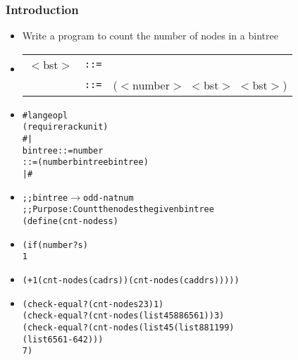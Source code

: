 \documentclass{beamer}
\newcommand{\arrow}{\(\rightarrow\)}
\newcommand{\elist}{\texttt{\textquotesingle{()}}}
\newcommand{\is}{\texttt{::=}}
\begin{document}
\begin{frame}[fragile]
\frametitle{Introduction}
\begin{scriptsize}
\begin{itemize}
\item<1-> Write a program to count the number of nodes in a bintree

\item<2->
\begin{tabular}{lll}
    $<$bst$>$ & \is{} & \elist{} \\
     & \is{} & ($<$number$>$ $<$bst$>$ $<$bst$>$) \\
\end{tabular}

\item<3->
\begin{alltt}
#lang eopl
(require rackunit)
#|
bintree \is{} number
        \is{} (number bintree bintree)
|#
\end{alltt}

\item<4->
\begin{alltt}
;; bintree \arrow{} odd-natnum
;; Purpose: Count the nodes the given bintree
(define (cnt-nodes s)
\end{alltt}

\item<6->
\begin{alltt}
  (if (number? s)
      1
\end{alltt}

\item<7->
\begin{alltt}
      (+ 1 (cnt-nodes (cadr s)) (cnt-nodes (caddr s)))))
\end{alltt}

\item<5->
\begin{alltt}
(check-equal? (cnt-nodes 23) 1)
(check-equal? (cnt-nodes (list 45 88 6561)) 3)
(check-equal? (cnt-nodes (list 45 (list 88 11 99)
                                  (list 6561 -6 42)))
              7)
\end{alltt}

\end{itemize}
\end{scriptsize}
\end{frame}
\end{document}
